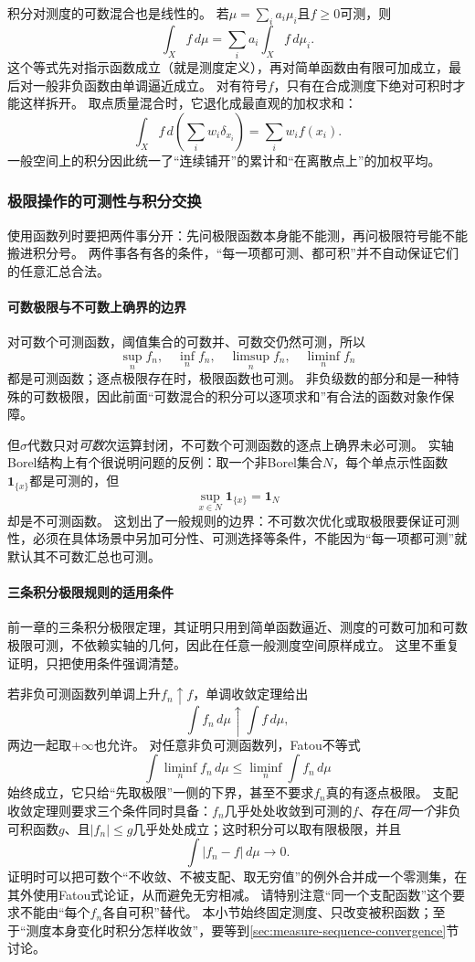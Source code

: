积分对测度的可数混合也是线性的。
若$\mu=\sum_i a_i\mu_i$且$f\geq0$可测，则
\[
 \int_X f\,d\mu=\sum_i a_i\int_X f\,d\mu_i.
\]
这个等式先对指示函数成立（就是测度定义），再对简单函数由有限可加成立，最后对一般非负函数由单调逼近成立。
对有符号$f$，只有在合成测度下绝对可积时才能这样拆开。
取点质量混合时，它退化成最直观的加权求和：
\[
 \int_X f\,d\!\left(\sum_i w_i\delta_{x_i}\right)=\sum_i w_i f(x_i).
\]
一般空间上的积分因此统一了“连续铺开”的累计和“在离散点上”的加权平均。

\subsubsection{极限操作的可测性与积分交换}

使用函数列时要把两件事分开：先问极限函数本身能不能测，再问极限符号能不能搬进积分号。
两件事各有各的条件，“每一项都可测、都可积”并不自动保证它们的任意汇总合法。

\paragraph{可数极限与不可数上确界的边界}

对可数个可测函数，阈值集合的可数并、可数交仍然可测，所以
\[
 \sup_n f_n,\quad\inf_n f_n,\quad\limsup_n f_n,\quad\liminf_n f_n
\]
都是可测函数；逐点极限存在时，极限函数也可测。
非负级数的部分和是一种特殊的可数极限，因此前面“可数混合的积分可以逐项求和”有合法的函数对象作保障。

但$\sigma$代数只对\emph{可数}次运算封闭，不可数个可测函数的逐点上确界未必可测。
实轴Borel结构上有个很说明问题的反例：取一个非Borel集合$N$，每个单点示性函数$\mathbf 1_{\{x\}}$都是可测的，但
\[
 \sup_{x\in N}\mathbf 1_{\{x\}}=\mathbf 1_N
\]
却是不可测函数。
这划出了一般规则的边界：不可数次优化或取极限要保证可测性，必须在具体场景中另加可分性、可测选择等条件，不能因为“每一项都可测”就默认其不可数汇总也可测。

\paragraph{三条积分极限规则的适用条件}

前一章的三条积分极限定理，其证明只用到简单函数逼近、测度的可数可加和可数极限可测，不依赖实轴的几何，因此在任意一般测度空间原样成立。
这里不重复证明，只把使用条件强调清楚。

若非负可测函数列单调上升$f_n\uparrow f$，单调收敛定理给出
\[
 \int f_n\,d\mu\uparrow\int f\,d\mu,
\]
两边一起取$+\infty$也允许。
对任意非负可测函数列，Fatou不等式
\[
 \int\liminf_n f_n\,d\mu\leq\liminf_n\int f_n\,d\mu
\]
始终成立，它只给“先取极限”一侧的下界，甚至不要求$f_n$真的有逐点极限。
支配收敛定理则要求三个条件同时具备：$f_n$几乎处处收敛到可测的$f$、存在\emph{同一个}非负可积函数$g$、且$|f_n|\leq g$几乎处处成立；这时积分可以取有限极限，并且
\[
 \int|f_n-f|\,d\mu\to0.
\]
证明时可以把可数个“不收敛、不被支配、取无穷值”的例外合并成一个零测集，在其外使用Fatou式论证，从而避免无穷相减。
请特别注意“同一个支配函数”这个要求不能由“每个$f_n$各自可积”替代。
本小节始终固定测度、只改变被积函数；至于“测度本身变化时积分怎样收敛”，要等到\ref{sec:measure-sequence-convergence}节讨论。

